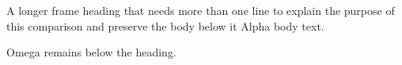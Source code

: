 \documentclass[11pt,aspectratio=169]{beamer}
\date{}
\begin{document}
\begin{frame}{A longer frame heading that needs more than one line to explain the purpose of this comparison and preserve the body below it}
Alpha body text.

Omega remains below the heading.
\end{frame}
\end{document}
